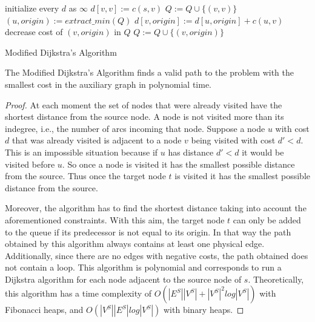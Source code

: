 \begin{algorithm}
initialize every $d$ as $\infty$\;
{$d[v,v] := c(s,v)$\;
  $Q := Q \cup \{(v,v)\}$\;
}
  {$(u, origin) := extract\_min(Q)$\;
    {
      {$d[v, origin] := d[u, origin] + c(u,v)$\;
        {decrease cost of $(v,origin)$ in $Q$\;}
        {$Q := Q \cup \{(v,origin)\}$\;}
      }
    }
  }
\caption{Modified Dijkstra's Algorithm}
\label{alg:dij}
\end{algorithm}

\begin{proposition} The Modified Dijkstra's Algorithm finds a valid path to the problem with the smallest cost in the auxiliary graph in polynomial time.
\end{proposition}
\begin{proof}
  At each moment the set of nodes that were already visited have the shortest distance from the source node.
  A node is not visited more than its indegree, i.e., the number of arcs incoming that node.
  Suppose a node $u$ with cost $d$ that was already visited is adjacent to a node $v$ being visited with cost $d' < d$.
  This is an impossible situation because if $u$ has distance $d'<d$ it would be visited before $u$.
  So once a node is visited it has the smallest possible distance from the source.
  Thus once the target node $t$ is visited it has the smallest possible distance from the source.

  Moreover, the algorithm has to find the shortest distance taking into account the aforementioned constraints.
  With this aim, the target node $t$ can only be added to the queue if its predecessor is not equal to its origin.
  In that way the path obtained by this algorithm always contains at least one physical edge. Additionally, since there are no edges with negative costs, the path obtained does not contain a loop.
  This algorithm is polynomial and corresponds to run a Dijkstra algorithm for each node adjacent to the source node of $s$.
  Theoretically, this algorithm has a time complexity of $O(|E^S||V^S| + |V^S|^2log|V^S|)$ with Fibonacci heaps, and $O(|V^S||E^S|log|V^S|)$ with binary heaps.
\end{proof}
